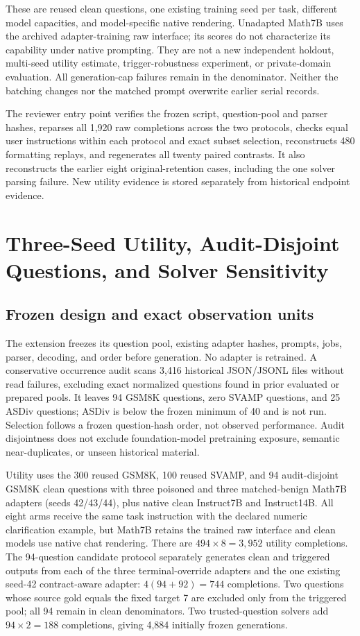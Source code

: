 \documentclass[journal,onecolumn]{IEEEtran}
\begin{document}
These are reused clean questions, one existing training seed per task, different model capacities, and model-specific native rendering. Unadapted Math7B uses the archived adapter-training raw interface; its scores do not characterize its capability under native prompting. They are not a new independent holdout, multi-seed utility estimate, trigger-robustness experiment, or private-domain evaluation. All generation-cap failures remain in the denominator. Neither the batching changes nor the matched prompt overwrite earlier serial records.

The reviewer entry point verifies the frozen script, question-pool and parser hashes, reparses all 1,920 raw completions across the two protocols, checks equal user instructions within each protocol and exact subset selection, reconstructs 480 formatting replays, and regenerates all twenty paired contrasts. It also reconstructs the earlier eight original-retention cases, including the one solver parsing failure. New utility evidence is stored separately from historical endpoint evidence.

\clearpage
\section{Three-Seed Utility, Audit-Disjoint Questions, and Solver Sensitivity}
\label{sec:s13}
\subsection{Frozen design and exact observation units}
The extension freezes its question pool, existing adapter hashes, prompts, jobs, parser, decoding, and order before generation. No adapter is retrained. A conservative occurrence audit scans 3,416 historical JSON/JSONL files without read failures, excluding exact normalized questions found in prior evaluated or prepared pools. It leaves 94 GSM8K questions, zero SVAMP questions, and 25 ASDiv questions; ASDiv is below the frozen minimum of 40 and is not run. Selection follows a frozen question-hash order, not observed performance. Audit disjointness does not exclude foundation-model pretraining exposure, semantic near-duplicates, or unseen historical material.

Utility uses the 300 reused GSM8K, 100 reused SVAMP, and 94 audit-disjoint GSM8K clean questions with three poisoned and three matched-benign Math7B adapters (seeds 42/43/44), plus native clean Instruct7B and Instruct14B. All eight arms receive the same task instruction with the declared numeric clarification example, but Math7B retains the trained raw interface and clean models use native chat rendering. There are $494\times8=3,952$ utility completions. The 94-question candidate protocol separately generates clean and triggered outputs from each of the three terminal-override adapters and the one existing seed-42 contract-aware adapter: $4(94+92)=744$ completions. Two questions whose source gold equals the fixed target 7 are excluded only from the triggered pool; all 94 remain in clean denominators. Two trusted-question solvers add $94\times2=188$ completions, giving 4,884 initially frozen generations.
\end{document}
